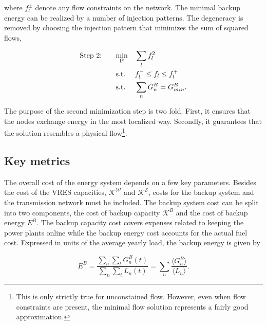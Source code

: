 \documentclass[a4paper, 12pt, sort&compress]{elsarticle}%
\begin{document}
where $f_{l}^{\pm}$ denote any flow constraints on the network.  The
minimal backup energy can be realized by a number of injection
patterns. The degeneracy is removed by choosing the injection pattern
that minimizes the sum of squared flows,

\begin{equation}
  \begin{aligned}
    \label{eq:step2}
    \text{Step 2: \hspace{15pt}} & \underset{\mathbf{P}}{\text{min}}
    & & \sum_{l} f_{l}^{2} \\
    & \text{s.t.}
    & & f_{l}^{-} \leq f_{l} \leq f_{l}^{+} \\
    & \text{s.t.}
    & & \sum_{n} G_{n}^{B} = G^{B}_{min} .
  \end{aligned}
\end{equation}

The purpose of the second minimization step is two fold. First, it
ensures that the nodes exchange energy in the most localized
way. Secondly, it guarantees that the solution resembles a physical
flow\footnote{This is only strictly true for unconstained
  flow. However, even when flow constraints are present, the minimal
  flow solution represents a fairly good approximation\cite{Magnus}.}.

\subsection{Key metrics}

The overall cost of the energy system depends on a few key
parameters. Besides the cost of the VRES capacities, $\mathcal{K^{W}}$
and $\mathcal{K^S}$, costs for the backup system and the transmission
network must be included. The backup system cost can be split into two
components, the cost of backup capacity $\mathcal{K}^{B}$ and the cost
of backup energy $E^{B}$. The backup capacity cost covers expenses
related to keeping the power plants online while the backup energy
cost accounts for the actual fuel cost. Expressed in units of the
average yearly load, the backup energy is given by

\begin{equation}
  \label{eq:backup-energy}
  E^{B} =\frac{\sum_{n} \sum_{t} G^{B}_{n}(t)}{\sum_{n} \sum_{t}
    L_{n}(t)} = \sum_{n} \frac{\langle G^{B}_{n} \rangle}{\langle L_{n}
    \rangle} .
\end{equation}
\end{document}
